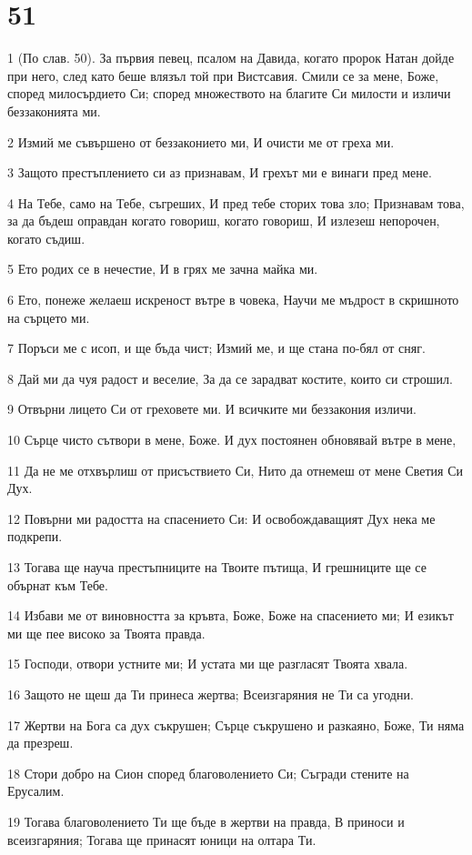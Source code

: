 \chapter{51}

\par 1 (По слав. 50). За първия певец, псалом на Давида, когато пророк Натан дойде при него, след като беше влязъл той при Вистсавия. Смили се за мене, Боже, според милосърдието Си; според множеството на благите Си милости и изличи беззаконията ми.
\par 2 Измий ме съвършено от беззаконието ми, И очисти ме от греха ми.
\par 3 Защото престъплението си аз признавам, И грехът ми е винаги пред мене.
\par 4 На Тебе, само на Тебе, съгреших, И пред тебе сторих това зло; Признавам това, за да бъдеш оправдан когато говориш, когато говориш, И излезеш непорочен, когато съдиш.
\par 5 Ето родих се в нечестие, И в грях ме зачна майка ми.
\par 6 Ето, понеже желаеш искреност вътре в човека, Научи ме мъдрост в скришното на сърцето ми.
\par 7 Поръси ме с исоп, и ще бъда чист; Измий ме, и ще стана по-бял от сняг.
\par 8 Дай ми да чуя радост и веселие, За да се зарадват костите, които си строшил.
\par 9 Отвърни лицето Си от греховете ми. И всичките ми беззакония изличи.
\par 10 Сърце чисто сътвори в мене, Боже. И дух постоянен обновявай вътре в мене,
\par 11 Да не ме отхвърлиш от присъствието Си, Нито да отнемеш от мене Светия Си Дух.
\par 12 Повърни ми радостта на спасението Си: И освобождаващият Дух нека ме подкрепи.
\par 13 Тогава ще науча престъпниците на Твоите пътища, И грешниците ще се обърнат към Тебе.
\par 14 Избави ме от виновността за кръвта, Боже, Боже на спасението ми; И езикът ми ще пее високо за Твоята правда.
\par 15 Господи, отвори устните ми; И устата ми ще разгласят Твоята хвала.
\par 16 Защото не щеш да Ти принеса жертва; Всеизгаряния не Ти са угодни.
\par 17 Жертви на Бога са дух съкрушен; Сърце съкрушено и разкаяно, Боже, Ти няма да презреш.
\par 18 Стори добро на Сион според благоволението Си; Съгради стените на Ерусалим.
\par 19 Тогава благоволението Ти ще бъде в жертви на правда, В приноси и всеизгаряния; Тогава ще принасят юници на олтара Ти.


